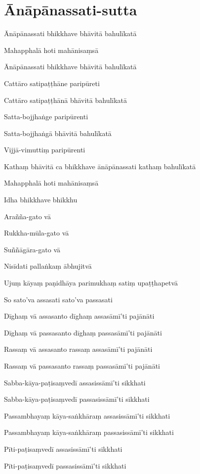 \section{Ānāpānassati-sutta}


\begin{leader}
\end{leader}

Ānāpānassati bhikkhave bhāvitā bahulīkatā

Mahapphalā hoti mahānisaṃsā

Ānāpānassati bhikkhave bhāvitā bahulīkatā

Cattāro satipaṭṭhāne paripūreti

Cattāro satipaṭṭhānā bhāvitā bahulīkatā

Satta-bojjhaṅge paripūrenti

Satta-bojjhaṅgā bhāvitā bahulīkatā

Vijjā-vimuttiṃ paripūrenti

Kathaṃ bhāvitā ca bhikkhave ānāpānassati kathaṃ bahulīkatā

Mahapphalā hoti mahānisaṃsā

Idha bhikkhave bhikkhu

Arañña-gato vā

Rukkha-mūla-gato vā

Suññāgāra-gato vā

Nisīdati pallaṅkaṃ ābhujitvā

Ujuṃ kāyaṃ paṇidhāya parimukhaṃ satiṃ upaṭṭhapetvā

So sato'va assasati sato'va passasati

Dīghaṃ vā assasanto dīghaṃ assasāmī'ti pajānāti

Dīghaṃ vā passasanto dīghaṃ passasāmī'ti pajānāti

Rassaṃ vā assasanto rassaṃ assasāmī'ti pajānāti

Rassaṃ vā passasanto rassaṃ passasāmī'ti pajānāti

Sabba-kāya-paṭisaṃvedī assasissāmī'ti sikkhati

Sabba-kāya-paṭisaṃvedī passasissāmī'ti sikkhati

Passambhayaṃ kāya-saṅkhāraṃ assasissāmī'ti sikkhati

Passambhayaṃ kāya-saṅkhāraṃ passasissāmī'ti sikkhati

Pīti-paṭisaṃvedī assasissāmī'ti sikkhati

Pīti-paṭisaṃvedī passasissāmī'ti sikkhati

